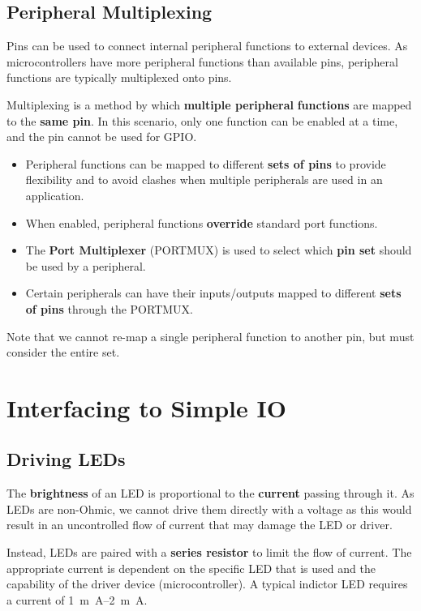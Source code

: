 \documentclass{report}
\begin{document}
\subsection{Peripheral Multiplexing}
Pins can be used to connect internal peripheral functions to external
devices. As microcontrollers have more peripheral functions than
available pins, peripheral functions are typically multiplexed onto
pins.
\begin{definition}[Multiplexing]
    Multiplexing is a method by which \textbf{multiple peripheral} \linebreak \textbf{functions}
    are mapped to the \textbf{same pin}.
    In this scenario, only one function can be enabled at a time, and the pin
    cannot be used for GPIO\@.
\end{definition}
\begin{itemize}
    \item Peripheral functions can be mapped to different \textbf{sets
          of pins} to provide flexibility and to avoid clashes when
          multiple peripherals are used in an application.
    \item When enabled, peripheral functions \textbf{override} standard
          port functions.
    \item The \textbf{Port Multiplexer} (PORTMUX) is used to select
          which \textbf{pin set} should be used by a peripheral.
    \item Certain peripherals can have their inputs/outputs mapped to
          different \textbf{sets of pins} through the PORTMUX\@.
\end{itemize}
Note that we cannot re-map a single peripheral function to another pin, but must consider the entire set.
\section{Interfacing to Simple IO}
\subsection{Driving LEDs}
The \textbf{brightness} of an LED is proportional to the
\textbf{current} passing through it. As LEDs are non-Ohmic, we cannot
drive them directly with a voltage as this would result in an
uncontrolled flow of current that may damage the LED or driver.

Instead, LEDs are paired with a \textbf{series resistor} to limit the
flow of current. The appropriate current is dependent on the specific
LED that is used and the capability of the driver device
(microcontroller). A typical indictor LED requires a current of
\qtyrange{1}{2}{m.A}.
\end{document}
